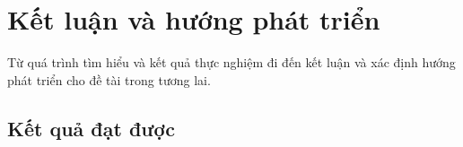 \chapter{Kết luận và hướng phát triển}
\noindent

Từ quá trình tìm hiểu và kết quả thực nghiệm đi đến kết luận và xác định hướng phát triển cho đề tài trong tương lai.

\section{Kết quả đạt được}
	
	

